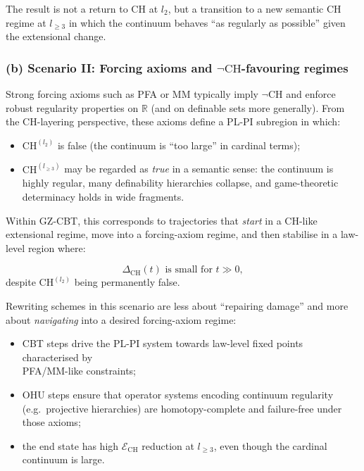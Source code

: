 \documentclass[11pt]{book}
\theoremstyle{plain}
\theoremstyle{definition}
\begin{document}
The result is not a return to CH at $l_2$, but a transition to a new
semantic CH regime at $l_{\ge3}$ in which the continuum behaves “as
regularly as possible” given the extensional change.



\subsubsection*{(b) Scenario II: Forcing axioms and $\neg\mathrm{CH}$-favouring regimes}

Strong forcing axioms such as PFA or MM typically imply $\neg\mathrm{CH}$
and enforce robust regularity properties on $\mathbb{R}$ (and on
definable sets more generally). From the CH-layering perspective, these
axioms define a PL-PI subregion in which:

\begin{itemize}
  \item $\mathrm{CH}^{(l_2)}$ is false (the continuum is “too large” in
        cardinal terms);
  \item $\mathrm{CH}^{(l_{\ge3})}$ may be regarded as \emph{true} in a
        semantic sense: the continuum is highly regular, many
        definability hierarchies collapse, and game-theoretic
        determinacy holds in wide fragments.
\end{itemize}

Within GZ-CBT, this corresponds to trajectories that \emph{start} in a
CH-like extensional regime, move into a forcing-axiom regime, and then
stabilise in a law-level region where:

\[
  \Delta_{\mathrm{CH}}(t) \text{ is small for } t\gg0,
\]
despite $\mathrm{CH}^{(l_2)}$ being permanently false.

Rewriting schemes in this scenario are less about “repairing damage”
and more about \emph{navigating} into a desired forcing-axiom regime:

\begin{itemize}
  \item CBT steps drive the PL-PI system towards law-level fixed points
        characterised by \\ PFA/MM-like constraints;
  \item OHU steps ensure that operator systems encoding continuum
        regularity (e.g.\ projective hierarchies) are homotopy-complete
        and failure-free under those axioms;
  \item the end state has high $\mathcal{E}_{\mathrm{CH}}$ reduction
        at $l_{\ge3}$, even though the cardinal continuum is large.
\end{itemize}
\end{document}
